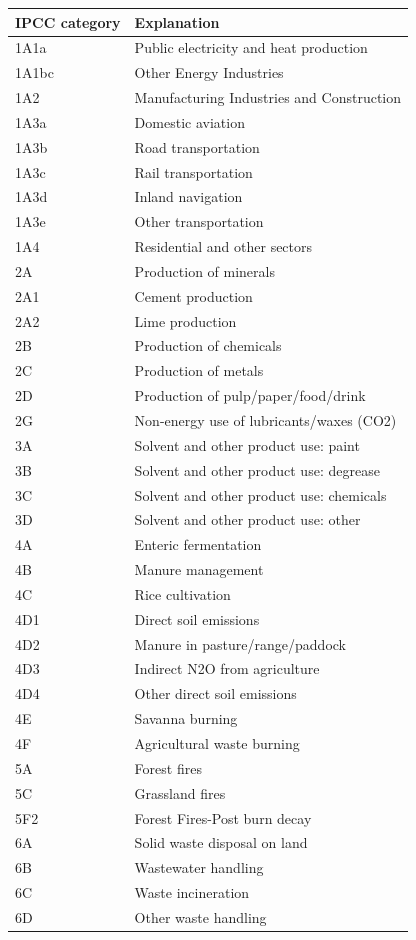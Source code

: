 \documentclass[10pt,a4paper,titlepage,dvipdfmx]{book}
\begin{document}
\begin{tabularx}{\textwidth}{ll} 
\caption{\label{tab:EmissionSources} Emission sources}
\\\hline 
IPCC category & Explanation \\\hline 
1A1a & Public electricity and heat production\\
1A1bc & Other Energy Industries\\
1A2 & Manufacturing Industries and Construction\\
1A3a & Domestic aviation\\
1A3b & Road transportation\\
1A3c & Rail transportation\\
1A3d & Inland navigation\\
1A3e & Other transportation\\
1A4 & Residential and other sectors\\ \hline 
2A & Production of minerals\\
2A1 & Cement production\\
2A2 & Lime production\\
2B & Production of chemicals\\
2C & Production of metals\\
2D & Production of pulp/paper/food/drink\\
2G & Non-energy use of lubricants/waxes (CO2)\\
3A & Solvent and other product use: paint\\
3B & Solvent and other product use: degrease\\
3C & Solvent and other product use: chemicals\\
3D & Solvent and other product use: other\\
4A & Enteric fermentation\\
4B & Manure management\\
4C & Rice cultivation\\
4D1 & Direct soil emissions\\
4D2 & Manure in pasture/range/paddock\\
4D3 & Indirect N2O from agriculture\\
4D4 & Other direct soil emissions\\
4E & Savanna burning\\
4F & Agricultural waste burning\\
5A & Forest fires\\
5C & Grassland fires\\
5F2 & Forest Fires-Post burn decay\\
6A & Solid waste disposal on land\\
6B & Wastewater handling\\
6C & Waste incineration\\
6D & Other waste handling\\ \hline 
\end{tabularx}
\end{document}
